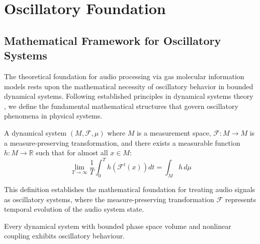 \section{Oscillatory Foundation}

\subsection{Mathematical Framework for Oscillatory Systems}

The theoretical foundation for audio processing via gas molecular information models rests upon the mathematical necessity of oscillatory behavior in bounded dynamical systems. Following established principles in dynamical systems theory \cite{arnold1978mathematical}, we define the fundamental mathematical structures that govern oscillatory phenomena in physical systems.

\begin{definition}
A dynamical system $(M, \mathcal{F}, \mu)$ where $M$ is a measurement space, $\mathcal{F}: M \to M$ is a measure-preserving transformation, and there exists a measurable function $h: M \to \mathbb{R}$ such that for almost all $x \in M$:
\begin{equation}
\lim_{T \to \infty} \frac{1}{T}\int_0^T h(\mathcal{F}^t(x)) dt = \int_M h \, d\mu
\end{equation}
\end{definition}

This definition establishes the mathematical foundation for treating audio signals as oscillatory systems, where the measure-preserving transformation $\mathcal{F}$ represents temporal evolution of the audio system state.


\begin{theorem}
Every dynamical system with bounded phase space volume and nonlinear coupling exhibits oscillatory behaviour.
\end{theorem}

